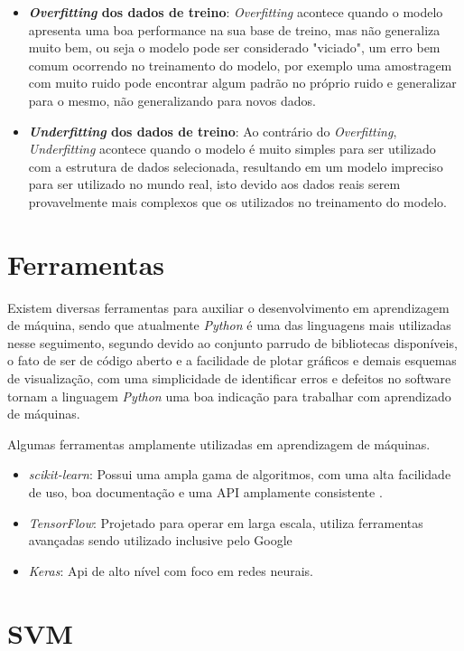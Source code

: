 \begin{itemize}
    \item \textbf{\textit{Overfitting} dos dados de treino}: \textit{Overfitting} acontece quando o modelo apresenta uma boa performance na sua base de treino, mas não generaliza muito bem, ou seja o modelo pode ser considerado "viciado", um erro bem comum ocorrendo no treinamento do modelo, por exemplo uma amostragem com muito ruido pode encontrar algum padrão no próprio ruido e generalizar para o mesmo, não generalizando para novos dados.
    \item \textbf{\textit{Underfitting} dos dados de treino}: Ao contrário do \textit{Overfitting}, \textit{Underfitting} acontece quando o modelo é muito simples para ser utilizado com a estrutura de dados selecionada, resultando em um modelo impreciso para ser utilizado no mundo real, isto devido aos dados reais serem provavelmente mais complexos que os utilizados no treinamento do modelo.
\end{itemize}

\section{Ferramentas}
Existem diversas ferramentas para auxiliar o desenvolvimento em aprendizagem de máquina, sendo que atualmente \textit{Python} é uma das linguagens mais utilizadas nesse seguimento, segundo  devido ao conjunto parrudo de bibliotecas disponíveis, o fato de ser de código aberto e a facilidade de plotar gráficos e demais esquemas de visualização, com uma simplicidade de identificar erros e defeitos no software tornam a linguagem \textit{Python} uma boa indicação para trabalhar com aprendizado de máquinas.

Algumas ferramentas amplamente utilizadas em aprendizagem de máquinas.
\begin{itemize}
    \item \textit{scikit-learn}: Possui uma ampla gama de algoritmos, com uma alta facilidade de uso, boa documentação e uma API amplamente consistente \cite{scikit-learn}. 
    \item \textit{TensorFlow}: Projetado para operar em larga escala, utiliza ferramentas avançadas sendo utilizado inclusive pelo Google\cite{abadi2016tensorflow}
    \item \textit{Keras}: Api de alto nível com foco em redes neurais.
\end{itemize}

\section{SVM}

